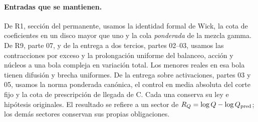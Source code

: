 \paragraph{Entradas que se mantienen.}
De R1, sección del permanente, usamos la identidad formal de Wick, la cota de coeficientes
en un disco mayor que uno y la cola \emph{ponderada} de la mezcla gamma.
De R9, parte 07, y de la entrega a dos tercios, partes 02--03, usamos las contracciones
por exceso y la prolongación uniforme del balanceo, acción y núcleos a una bola compleja
en variación total. Los menores reales en esa bola tienen difusión y brecha uniformes.
De la entrega sobre activaciones, partes 03 y 05, usamos la norma ponderada canónica,
el control en media absoluta del corte fijo y la cota de prescripción de llegada de C.
Cada una conserva su ley e hipótesis originales. El resultado se refiere a un sector de
$R_Q=\log Q-\log Q_{\rm pred}$; los demás sectores conservan sus propias obligaciones.

